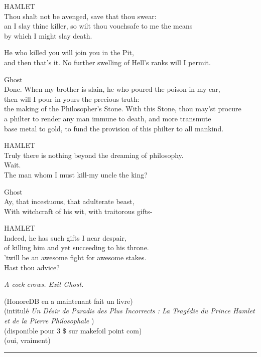 HAMLET\\Thou shalt not be avenged, save that thou swear:\\an I slay thine killer, so wilt thou vouchsafe to me the means\\by which I might slay death.

He who killed you will join you in the Pit,\\and then that's it. No further swelling of Hell's ranks will I permit.

Ghost\\Done. When my brother is slain, he who poured the poison in my ear,\\then will I pour in yours the precious truth:\\the making of the Philosopher's Stone. With this Stone, thou may'st procure\\a philter to render any man immune to death, and more transmute\\base metal to gold, to fund the provision of this philter to all mankind.

HAMLET\\Truly there is nothing beyond the dreaming of philosophy.\\Wait.\\The man whom I must kill-my uncle the king?

Ghost\\Ay, that incestuous, that adulterate beast,\\With witchcraft of his wit, with traitorous gifts-

HAMLET\\Indeed, he has such gifts I near despair,\\of killing him and yet succeeding to his throne.\\'twill be an awesome fight for awesome stakes.\\Hast thou advice?

\emph{A cock crows. Exit Ghost.} 


\begin{center}(HonoreDB en a maintenant fait un livre)\\(intitulé \emph{Un Désir de Paradis des Plus Incorrects : La Tragédie du Prince Hamlet et de la Pierre Philosophale} )\\(disponible pour 3 \$ sur makefoil point com)\\(oui, vraiment)\end{center}

\par\noindent\rule{\textwidth}{0.4pt}

